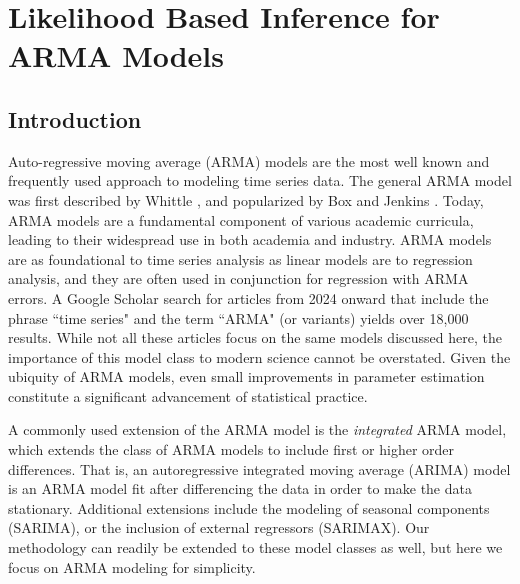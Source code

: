 \chapter{Likelihood Based Inference for ARMA Models}
\label{chpt:conclusion}





\section{Introduction}
\label{sec:intro}

Auto-regressive moving average (ARMA) models are the most well known and frequently used approach to modeling time series data.
The general ARMA model was first described by Whittle \cite{whittle51}, and popularized by Box and Jenkins \cite{box1970}.
Today, ARMA models are a fundamental component of various academic curricula, leading to their widespread use in both academia and industry.
ARMA models are as foundational to time series analysis as linear models are to regression analysis, and they are often used in conjunction for regression with ARMA errors.
A Google Scholar search for articles from 2024 onward that include the phrase ``time series" and the term ``ARMA" (or variants) yields over 18,000 results.
While not all these articles focus on the same models discussed here, the importance of this model class to modern science cannot be overstated.
Given the ubiquity of ARMA models, even small improvements in parameter estimation constitute a significant advancement of statistical practice.

A commonly used extension of the ARMA model is the \emph{integrated} ARMA model, which extends the class of ARMA models to include first or higher order differences.
That is, an autoregressive integrated moving average (ARIMA) model is an ARMA model fit after differencing the data in order to make the data stationary.
Additional extensions include the modeling of seasonal components (SARIMA), or the inclusion of external regressors (SARIMAX).
Our methodology can readily be extended to these model classes as well, but here we focus on ARMA modeling for simplicity.

